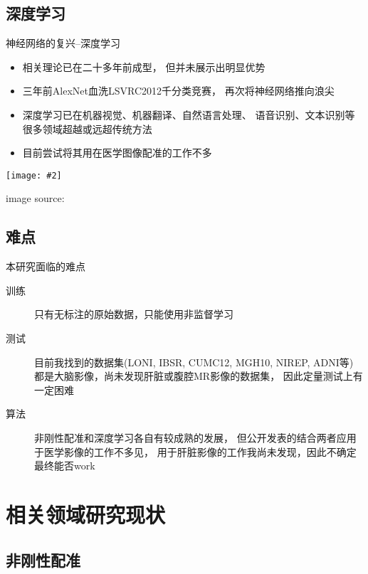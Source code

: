 \documentclass {beamer}
\newcommand{\addgraph}[2]{\begin{center}
\texttt{[image: \#2]}\end{center}}
\begin{document}
\subsection{深度学习}

\begin{frame}{神经网络的复兴--深度学习}
    \begin{itemize}
        \item 相关理论已在二十多年前成型，
            但并未展示出明显优势
        \item 三年前AlexNet血洗LSVRC2012千分类竞赛，
            再次将神经网络推向浪尖
        \item 深度学习已在机器视觉、机器翻译、自然语言处理、
            语音识别、文本识别等很多领域超越或远超传统方法
        \item 目前尝试将其用在医学图像配准的工作不多
    \end{itemize}

    \addgraph{0.5}{res/alexnet.png}
    \tiny{image source: \cite{krizhevsky2012imagenet}}
\end{frame}


\subsection{难点}
\begin{frame}{本研究面临的难点}
    \begin{description}
        \item[训练] 只有无标注的原始数据，只能使用非监督学习
        \item[测试] 目前我找到的数据集(LONI, IBSR, CUMC12, MGH10, NIREP, ADNI等)
            都是大脑影像，尚未发现肝脏或腹腔MR影像的数据集，
            因此定量测试上有一定困难
        \item[算法] 非刚性配准和深度学习各自有较成熟的发展，
            但公开发表的结合两者应用于医学影像的工作不多见，
            用于肝脏影像的工作我尚未发现，因此不确定最终能否work
    \end{description}
\end{frame}



\section{相关领域研究现状}

\subsection{非刚性配准}
\end{document}
